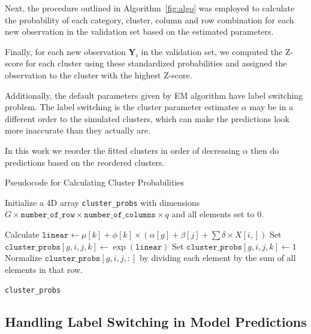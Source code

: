 \documentclass{article}
\begin{document}
Next, the procedure outlined in Algorithm~\ref{fig:algo} was employed to calculate the probability of each category, cluster, column and row combination for each new observation in the validation set based on the estimated parameters.

Finally, for each new observation $\bm{Y}_i$ in the validation set, we computed the Z-score for each cluster using these standardized probabilities and assigned the observation to the cluster with the highest Z-score.

Additionally, the default parameters given by EM algorithm have label switching problem.
The label switching is the cluster parameter estimates $\alpha$ may be in a different order to the simulated clusters, which can make the predictions look more inaccurate than they actually are.

In this work we reorder the fitted clusters in order of decreasing $\alpha$ then do predictions based on the reordered clusters.

\begin{algorithm}
  \caption{Pseudocode for Calculating Cluster Probabilities}
  \label{fig:algo}
  \begin{algorithmic}[1]
  \STATE Initialize a 4D array \texttt{cluster\_probs} with dimensions $G \times \texttt{number\_of\_row} \times \texttt{number\_of\_columns} \times q$ and all elements set to 0.
  
                      \STATE Calculate $\texttt{linear} \gets \mu[k] + \phi[k] \times (\alpha[g] + \beta[j] + \sum \delta \times X[i,])$
                      \STATE Set $\texttt{cluster\_probs}[g, i, j, k] \gets \exp(\texttt{linear})$
                  \ELSE
                      \STATE Set $\texttt{cluster\_probs}[g, i, j, k] \gets 1$
                  \ENDIF
              \ENDFOR
              \STATE Normalize $\texttt{cluster\_probs}[g, i, j, :]$ by dividing each element by the sum of all elements in that row.
          \ENDFOR
      \ENDFOR
  \ENDFOR
  
  \RETURN \texttt{cluster\_probs}
  \end{algorithmic}
\end{algorithm}

\subsection{Handling Label Switching in Model Predictions}
\end{document}
